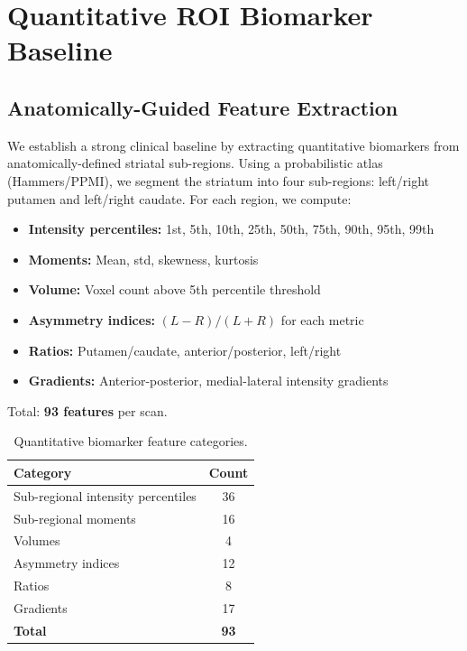 \section{Quantitative ROI Biomarker Baseline}
\label{sec:biomarkers}

\subsection{Anatomically-Guided Feature Extraction}
\label{sec:feature_extraction}

We establish a strong clinical baseline by extracting quantitative biomarkers from anatomically-defined striatal sub-regions. Using a probabilistic atlas (Hammers/PPMI), we segment the striatum into four sub-regions: left/right putamen and left/right caudate. For each region, we compute:

\begin{itemize}
    \item \textbf{Intensity percentiles:} 1st, 5th, 10th, 25th, 50th, 75th, 90th, 95th, 99th
    \item \textbf{Moments:} Mean, std, skewness, kurtosis
    \item \textbf{Volume:} Voxel count above 5th percentile threshold
    \item \textbf{Asymmetry indices:} $(L - R) / (L + R)$ for each metric
    \item \textbf{Ratios:} Putamen/caudate, anterior/posterior, left/right
    \item \textbf{Gradients:} Anterior-posterior, medial-lateral intensity gradients
\end{itemize}

Total: \textbf{93 features} per scan.

\begin{table}[htbp]
\centering
\caption{Quantitative biomarker feature categories.}
\label{tab:biomarker_features}
\begin{tabular}{lc}
\toprule
\textbf{Category} & \textbf{Count} \\
\midrule
Sub-regional intensity percentiles & 36 \\
Sub-regional moments & 16 \\
Volumes & 4 \\
Asymmetry indices & 12 \\
Ratios & 8 \\
Gradients & 17 \\
\textbf{Total} & \textbf{93} \\
\bottomrule
\end{tabular}
\end{table}

